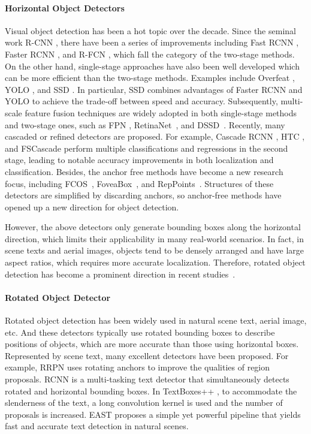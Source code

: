 \documentclass[10pt,twocolumn,letterpaper]{article}
\begin{document}
\paragraph{Horizontal Object Detectors}
Visual object detection has been a hot topic over the decade. Since the seminal work R-CNN \cite{girshick2014rich}, there have been a series of improvements including Fast RCNN \cite{girshick2015fast}, Faster RCNN \cite{R16_Ren2015Faster}, and R-FCN \cite{R15_dai2016r}, which fall the category of the two-stage methods. On the other hand, single-stage approaches have also been well developed which can be more efficient than the two-stage methods. Examples include Overfeat \cite{sermanet2013overfeat}, YOLO \cite{redmon2016you}, and SSD \cite{R11_liu2016ssd}. In particular, SSD \cite{R11_liu2016ssd} combines advantages of Faster RCNN and YOLO to achieve the trade-off between speed and accuracy. Subsequently, multi-scale feature fusion techniques are widely adopted in both single-stage methods and two-stage ones, such as FPN \cite{lin2017feature}, RetinaNet~\cite{R25_Lin2017Focal}, and DSSD~\cite{fu2017dssd}. Recently, many cascaded or refined detectors are proposed. For example, Cascade RCNN \cite{cai2018cascade}, HTC \cite{chen2019hybrid}, and FSCascade \cite{zhang2018single} perform multiple classifications and regressions in the second stage, leading to notable accuracy improvements in both localization and classification. Besides, the anchor free methods have become a new research focus, including FCOS~\cite{Tian_2019_ICCV}, FoveaBox~\cite{kong2019foveabox}, and RepPoints~\cite{Yang_2019_ICCV}. Structures of these detectors are simplified by discarding anchors, so anchor-free methods have opened up a new direction for object detection.

However, the above detectors only generate bounding boxes along the horizontal direction, which limits their applicability in many real-world scenarios. In fact, in scene texts and aerial images, objects tend to be densely arranged and have large aspect ratios, which requires more accurate localization. Therefore, rotated object detection has become a prominent direction in recent studies~\cite{Yang_2019_ICCV}.
\vspace{-10pt}
\paragraph{Rotated Object Detector}
Rotated object detection has been widely used in natural scene text, aerial image, etc. And these detectors typically use rotated bounding boxes to describe positions of objects, which are more accurate than those using horizontal boxes. Represented by scene text, many excellent detectors have been proposed. For example, RRPN \cite{R30_ma2018arbitrary} uses rotating anchors to improve the qualities of region proposals. RCNN \cite{R22_Jiang2017R2CNN} is a multi-tasking text detector that simultaneously detects rotated and horizontal bounding boxes. In TextBoxes++ \cite{R31_liao2018textboxes++}, to accommodate the slenderness of the text, a long convolution kernel is used and the number of proposals is increased. EAST \cite{Zhou2017EAST} proposes a simple yet powerful pipeline that yields fast and accurate text detection in natural scenes. 
\end{document}
